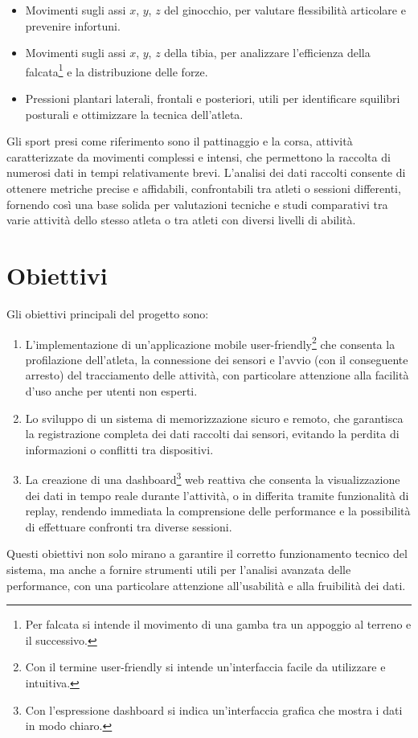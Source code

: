 \documentclass[target=bach,aauheader=,style=]{thud}
\begin{document}
\begin{itemize}
    \item Movimenti sugli assi $x$, $y$, $z$ del ginocchio, per valutare flessibilità articolare e prevenire infortuni.
    \item Movimenti sugli assi $x$, $y$, $z$ della tibia, per analizzare l’efficienza della falcata\footnote{Per falcata si intende il movimento di una gamba tra un appoggio al terreno e il successivo.} e la distribuzione delle forze.  
    \item Pressioni plantari laterali, frontali e posteriori, utili per identificare squilibri posturali e ottimizzare la tecnica dell’atleta.
\end{itemize}
Gli sport presi come riferimento sono il pattinaggio e la corsa, attività caratterizzate da movimenti complessi e intensi, che permettono la raccolta di numerosi dati in tempi relativamente brevi. L’analisi dei dati raccolti consente di ottenere metriche precise e affidabili, confrontabili tra atleti o sessioni differenti, fornendo così una base solida per valutazioni tecniche e studi comparativi tra varie attività dello stesso atleta o tra atleti con diversi livelli di abilità.
\section{Obiettivi}
Gli obiettivi principali del progetto sono:

\begin{enumerate}
    \item L'implementazione di un'applicazione mobile user-friendly\footnote{Con il termine user-friendly si intende un'interfaccia facile da utilizzare e intuitiva.} che consenta la profilazione dell'atleta, la connessione dei sensori e l'avvio (con il conseguente arresto) del tracciamento delle attività, con particolare attenzione alla facilità d’uso anche per utenti non esperti.
    \item Lo sviluppo di un sistema di memorizzazione sicuro e remoto, che garantisca la registrazione completa dei dati raccolti dai sensori, evitando la perdita di informazioni o conflitti tra dispositivi.
    \item La creazione di una dashboard\footnote{Con l'espressione dashboard si indica un'interfaccia grafica che mostra i dati in modo chiaro.} web reattiva che consenta la visualizzazione dei dati in tempo reale durante l’attività, o in differita tramite funzionalità di replay, rendendo immediata la comprensione delle performance e la possibilità di effettuare confronti tra diverse sessioni.
\end{enumerate}
Questi obiettivi non solo mirano a garantire il corretto funzionamento tecnico del sistema, ma anche a fornire strumenti utili per l’analisi avanzata delle performance, con una particolare attenzione all’usabilità e alla fruibilità dei dati.
\end{document}
